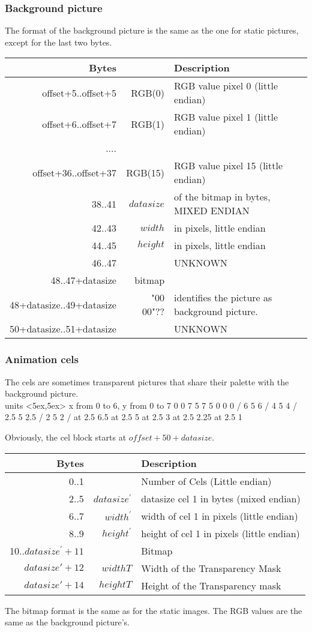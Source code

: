 \documentclass[11pt,twoside,openright]{report}
\begin{document}
\subsubsection{Background picture}
The format of the background picture is the same as the one for static pictures, except for the last two bytes.\\
\begin{tabular}{r|rl}
Bytes&&Description\\\hline
offset+5..offset+5&RGB(0)&RGB value pixel 0 (little endian)\\
offset+6..offset+7&RGB(1)&RGB value pixel 1 (little endian)\\
....&&\\
offset+36..offset+37&RGB(15)&RGB value pixel 15 (little endian)\\\hline
38..41&$datasize$& of the bitmap in bytes, MIXED ENDIAN\\
42..43&$width$& in pixels, little endian\\
44..45&$height$& in pixels, little endian\\
46..47&&UNKNOWN\\
48..47+datasize&bitmap\\\hline
48+datasize..49+datasize&"00 00"??&identifies the picture as background picture.\\
50+datasize..51+datasize&&UNKNOWN
\end{tabular}
\subsubsection{Animation cels}
The cels are sometimes transparent pictures that share their palette with the background picture.\\
\beginpicture
\setcoordinatesystem units <5ex,5ex>
\setplotarea x from 0 to 6, y from 0 to 7
 0 0 7 5 7 5 0 0 0 /
 6 5 6 /
 4 5 4 /
 2.5 5 2.5 /
 2 5 2 /
 at 2.5 6.5
 at 2.5 5
 at 2.5 3
 at 2.5 2.25
 at 2.5 1
\endpicture

Obviously, the cel block starts at $offset+50+datasize$.\\

\begin{tabular}{r|rl}
Bytes&&Description\\\hline
0..1&&Number of Cels (Little endian)\\\hline
2..5&$datasize^\prime$&datasize cel 1 in bytes (mixed endian)\\
6..7&$width^\prime$&width of cel 1 in pixels (little endian)\\
8..9&$height^\prime$&height of cel 1 in pixels (little endian)\\\hline
10..$datasize^\prime+11$&&Bitmap\\\hline
$datasize\prime+12$&$widthT$&Width of the Transparency Mask\\
$datasize\prime+14$&$heightT$&Height of the Transparency mask\\
\end{tabular}
The bitmap format is the same as for the static images. The RGB values are the same as the background picture's.\\
\end{document}
